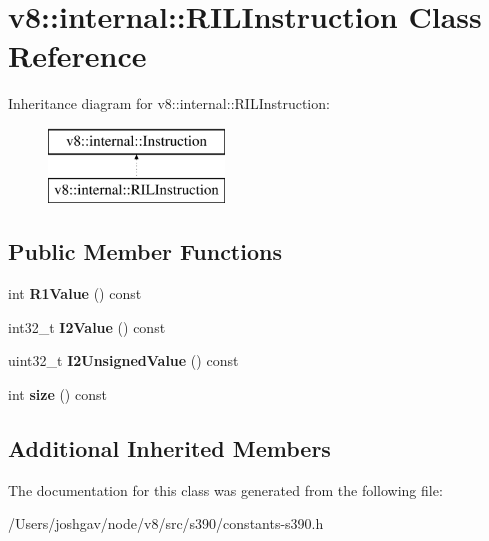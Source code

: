 \hypertarget{classv8_1_1internal_1_1_r_i_l_instruction}{}\section{v8\+:\+:internal\+:\+:R\+I\+L\+Instruction Class Reference}
\label{classv8_1_1internal_1_1_r_i_l_instruction}
Inheritance diagram for v8\+:\+:internal\+:\+:R\+I\+L\+Instruction\+:\begin{figure}[H]
\begin{center}
\leavevmode
\includegraphics[height=2.000000cm]{classv8_1_1internal_1_1_r_i_l_instruction}
\end{center}
\end{figure}
\subsection*{Public Member Functions}
\begin{DoxyCompactItemize}
\item 
int {\bfseries R1\+Value} () const \hypertarget{classv8_1_1internal_1_1_r_i_l_instruction_ab1b7c91af94761f9bfd6f893f23d8461}{}\label{classv8_1_1internal_1_1_r_i_l_instruction_ab1b7c91af94761f9bfd6f893f23d8461}

\item 
int32\+\_\+t {\bfseries I2\+Value} () const \hypertarget{classv8_1_1internal_1_1_r_i_l_instruction_a8a0942b4255a9fe5b1062bbb8be0eb60}{}\label{classv8_1_1internal_1_1_r_i_l_instruction_a8a0942b4255a9fe5b1062bbb8be0eb60}

\item 
uint32\+\_\+t {\bfseries I2\+Unsigned\+Value} () const \hypertarget{classv8_1_1internal_1_1_r_i_l_instruction_a92475cd0f3841c7273db507baa0844c7}{}\label{classv8_1_1internal_1_1_r_i_l_instruction_a92475cd0f3841c7273db507baa0844c7}

\item 
int {\bfseries size} () const \hypertarget{classv8_1_1internal_1_1_r_i_l_instruction_af46505404b138734e167f2bd27735065}{}\label{classv8_1_1internal_1_1_r_i_l_instruction_af46505404b138734e167f2bd27735065}

\end{DoxyCompactItemize}
\subsection*{Additional Inherited Members}


The documentation for this class was generated from the following file\+:\begin{DoxyCompactItemize}
\item 
/\+Users/joshgav/node/v8/src/s390/constants-\/s390.\+h\end{DoxyCompactItemize}
